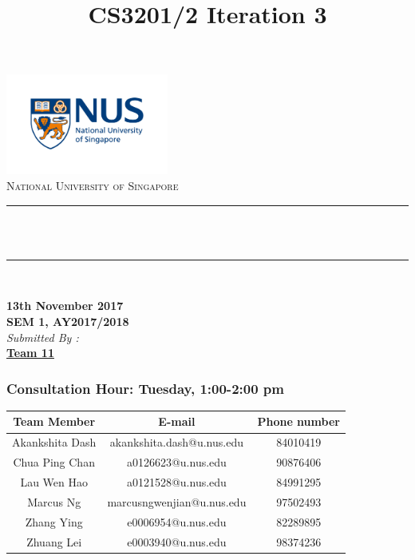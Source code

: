 \documentclass[12pt]{article}
\title{CS3201/2 Iteration 3}					%
\author{}
\makeatletter
\let\thetitle\@title
\makeatother
\begin{document}
\doublespacing


\begin{titlepage}
	\centering
    \includegraphics[width = 0.4\textwidth]{logo1.jpg}\\[0.4cm]	%
    \textsc{ National University of Singapore}\\[0.2 cm]	%
	\rule{\linewidth}{0.2 mm} \\[0.1 cm]
	{ \huge \bfseries \thetitle}\\
    \rule{\linewidth}{0.2 mm} \\[0.2 cm]
			\begin{center} 
            \textbf{13th November 2017}\\[0.7cm]
			\textbf { SEM 1, AY2017/2018}\\[0.7cm]
			\emph{Submitted By :} \\[0.1cm]
           
      \textbf{\underline{Team 11}}    
      \subsubsection*{Consultation Hour: Tuesday, 1:00-2:00 pm}
 \begin{table}[htbp]
\begin{tabular}{|c|c|c|}
\hline
\textbf{Team Member} & \textbf{E-mail} & \textbf{Phone number}\\\hline
Akankshita Dash & akankshita.dash@u.nus.edu & 84010419  \\
\hline
Chua Ping Chan & a0126623@u.nus.edu & 90876406 \\
\hline
Lau Wen Hao & a0121528@u.nus.edu & 84991295  \\
\hline
Marcus Ng & marcusngwenjian@u.nus.edu
 & 97502493  \\
\hline
Zhang Ying & e0006954@u.nus.edu
 & 82289895  \\
\hline
Zhuang Lei & e0003940@u.nus.edu
 & 98374236 \\
\hline
\end{tabular}
\end{table}
		    \end{center}
        


\end{titlepage}
\end{document}
